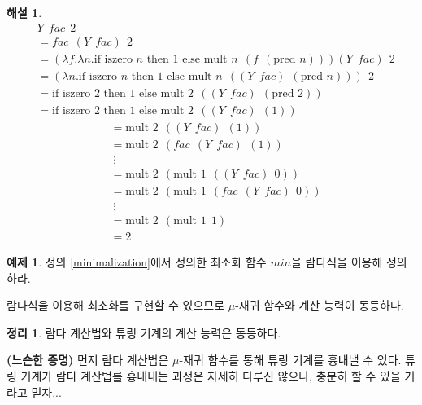 \documentclass[b5paper, 11pt]{book}
\theoremstyle{definition}
\newtheorem{thm}[defn]{정리}
\newtheorem{ex}[defn]{예제}
\newtheorem*{ans*}{해설}
\newenvironment{pf*}{\pushQED{\qed}\pf}
{\popQED\endpf}
\begin{document}
\begin{ans*}
    \begin{align*}
        &Y \;\, fac \;\, 2 \\ 
        &= fac \;\, (Y \;\, fac) \;\, 2 \\ 
        &= (\lambda f. \lambda n. \text{if } \text{iszero } n \text{ then }
        1 \text{ else } \text{mult } n \;\, (f \;\, (\text{pred } n))) (Y \;\, fac) \;\, 2 \\
        &= (\lambda n. \text{if } \text{iszero } n \text{ then }
        1 \text{ else } \text{mult } n \;\, ((Y \;\, fac) \;\, (\text{pred } n))) \;\, 2 \\
        &=   \text{if } \text{iszero } 2 \text{ then }
        1 \text{ else } \text{mult } 2 \;\, ((Y \;\, fac) \;\, (\text{pred } 2))\\
        &=  \text{if } \text{iszero } 2 \text{ then }
        1 \text{ else } \text{mult } 2 \;\, ((Y \;\, fac) \;\, (1)) 
    \end{align*}
    \begin{align*}
        &= \text{mult } 2 \;\, ((Y \;\, fac) \;\, (1)) \\
        &= \text{mult } 2 \;\, (fac \;\, (Y \;\, fac) \;\, (1)) \\ 
        &\; \vdots \\ 
        &= \text{mult } 2 \;\, (\text{mult } 1 \;\, ((Y \;\, fac) \;\, 0)) \\
        &= \text{mult } 2 \;\, (\text{mult } 1 \;\, (fac \;\, (Y \;\, fac) \;\, 0)) \\ 
        &\; \vdots \\ 
        &= \text{mult } 2 \;\, (\text{mult } 1 \;\, 1) \\
        &= 2 
    \end{align*}
\end{ans*}
\begin{ex}
    정의 \ref{minimalization}에서 정의한 최소화 함수 $min$을 람다식을 이용해 정의하라.
\end{ex}
람다식을 이용해 최소화를 구현할 수 있으므로 $\mu$-재귀 함수와 계산 능력이 동등하다. 
\begin{thm}
    람다 계산법와 튜링 기계의 계산 능력은 동등하다.
\end{thm}
\begin{pf*}
    \textbf{(느슨한 증명)}
    먼저 람다 계산법은 $\mu$-재귀 함수를 통해 튜링 기계를 흉내낼 수 있다. 튜링 기계가 람다 계산법를 흉내내는 과정은 자세히 다루진 않으나, 충분히 할 수 있을 거라고 믿자...
\end{pf*}
\end{document}
